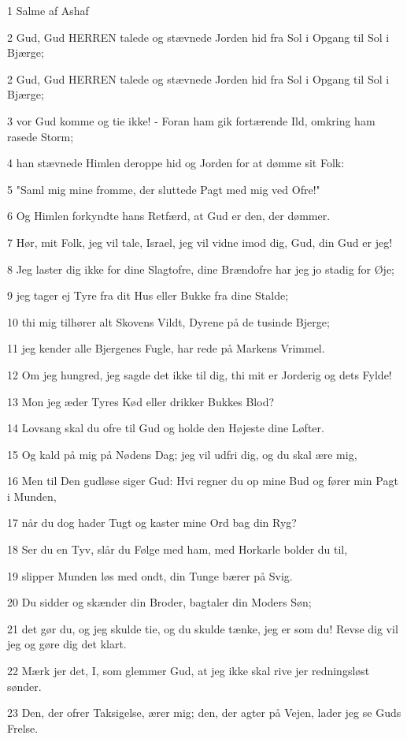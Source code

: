 \par 1 Salme af Ashaf
\par 2 Gud, Gud HERREN talede og stævnede Jorden hid fra Sol i Opgang til Sol i Bjærge;
\par 2 Gud, Gud HERREN talede og stævnede Jorden hid fra Sol i Opgang til Sol i Bjærge;
\par 3 vor Gud komme og tie ikke! - Foran ham gik fortærende Ild, omkring ham rasede Storm;
\par 4 han stævnede Himlen deroppe hid og Jorden for at dømme sit Folk:
\par 5 "Saml mig mine fromme, der sluttede Pagt med mig ved Ofre!"
\par 6 Og Himlen forkyndte hans Retfærd, at Gud er den, der dømmer.
\par 7 Hør, mit Folk, jeg vil tale, Israel, jeg vil vidne imod dig, Gud, din Gud er jeg!
\par 8 Jeg laster dig ikke for dine Slagtofre, dine Brændofre har jeg jo stadig for Øje;
\par 9 jeg tager ej Tyre fra dit Hus eller Bukke fra dine Stalde;
\par 10 thi mig tilhører alt Skovens Vildt, Dyrene på de tusinde Bjerge;
\par 11 jeg kender alle Bjergenes Fugle, har rede på Markens Vrimmel.
\par 12 Om jeg hungred, jeg sagde det ikke til dig, thi mit er Jorderig og dets Fylde!
\par 13 Mon jeg æder Tyres Kød eller drikker Bukkes Blod?
\par 14 Lovsang skal du ofre til Gud og holde den Højeste dine Løfter.
\par 15 Og kald på mig på Nødens Dag; jeg vil udfri dig, og du skal ære mig,
\par 16 Men til Den gudløse siger Gud: Hvi regner du op mine Bud og fører min Pagt i Munden,
\par 17 når du dog hader Tugt og kaster mine Ord bag din Ryg?
\par 18 Ser du en Tyv, slår du Følge med ham, med Horkarle bolder du til,
\par 19 slipper Munden løs med ondt, din Tunge bærer på Svig.
\par 20 Du sidder og skænder din Broder, bagtaler din Moders Søn;
\par 21 det gør du, og jeg skulde tie, og du skulde tænke, jeg er som du! Revse dig vil jeg og gøre dig det klart.
\par 22 Mærk jer det, I, som glemmer Gud, at jeg ikke skal rive jer redningsløst sønder.
\par 23 Den, der ofrer Taksigelse, ærer mig; den, der agter på Vejen, lader jeg se Guds Frelse.

